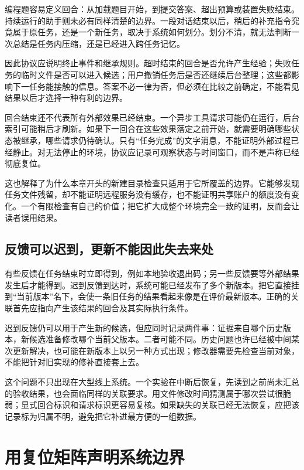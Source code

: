 编程题容易定义回合：从加载题目开始，到提交答案、超出预算或装置失败结束。持续运行的助手则未必有同样清楚的边界。一段对话结束以后，稍后的补充指令究竟属于原任务，还是一个新任务，取决于系统如何划分。划分不清，就无法判断一次总结是任务内压缩，还是已经进入跨任务记忆。

因此协议应说明终止事件和继承规则。超时结束的回合是否允许产生经验；失败任务的临时文件是否可以进入候选；用户撤销任务后是否还继续后台整理；这些都影响下一任务能接触的信息。答案不必一律为否，但必须在比较之前确定，不能看见结果以后才选择一种有利的边界。

回合结束还不代表所有外部效果已经结束。一个异步工具请求可能仍在运行，后台索引可能稍后才刷新。如果下一回合在这些效果落定之前开始，就需要明确哪些状态被继承，哪些请求仍待确认。只有“任务完成”的文字消息，不能证明外部过程已经静止。对无法停止的环境，协议应记录可观察状态与时间窗口，而不是声称已经彻底复位。

这也解释了为什么本章开头的新建目录检查只适用于它所覆盖的边界。它能够发现任务文件残留，却不能证明远程服务没有缓存，也不能证明共享账户的额度没有变化。一个有限检查有自己的价值；把它扩大成整个环境完全一致的证明，反而会让读者误用结果。

\subsection{反馈可以迟到，更新不能因此失去来处}

有些反馈在任务结束时立即得到，例如本地验收退出码；另一些反馈要等外部结果发生后才能得到。迟到反馈到达时，系统可能已经发布了多个新版本。把它直接挂到“当前版本”名下，会使一条旧任务的结果看起来像是在评价最新版本。正确的关联首先应指向产生该结果的回合及其实际执行条件。

迟到反馈仍可以用于产生新的候选，但应同时记录两件事：证据来自哪个历史版本，新候选准备修改哪个当前父版本。二者可能不同。历史问题也许已经被中间某次更新解决，也可能在新版本上以另一种方式出现；修改器需要先检查当前对象，不能把针对旧实现的修补直接套上去。

这个问题不只出现在大型线上系统。一个实验在中断后恢复，先读到之前尚未汇总的验收结果，也会面临同样的关联要求。用文件修改时间猜测属于哪次尝试很脆弱；显式回合标识和请求标识更容易复核。如果缺失的关联已经无法恢复，应把该记录标为归属不明，避免把它补进最方便的一组数据。

\section{用复位矩阵声明系统边界}
\label{sec:ch02-reset-matrix}

